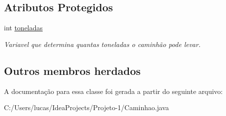 \subsection*{Atributos Protegidos}
\begin{DoxyCompactItemize}
\item 
\mbox{\label{class_caminhao_a76b6b066d32dac55e7b6e6669162b94e}} 
int \mbox{\hyperlink{class_caminhao_a76b6b066d32dac55e7b6e6669162b94e}{toneladas}}
\begin{DoxyCompactList}\small\item\em Variavel que determina quantas toneladas o caminhão pode levar. \end{DoxyCompactList}\end{DoxyCompactItemize}
\subsection*{Outros membros herdados}


A documentação para essa classe foi gerada a partir do seguinte arquivo\+:\begin{DoxyCompactItemize}
\item 
C\+:/\+Users/lucas/\+Idea\+Projects/\+Projeto-\/1/Caminhao.\+java\end{DoxyCompactItemize}
